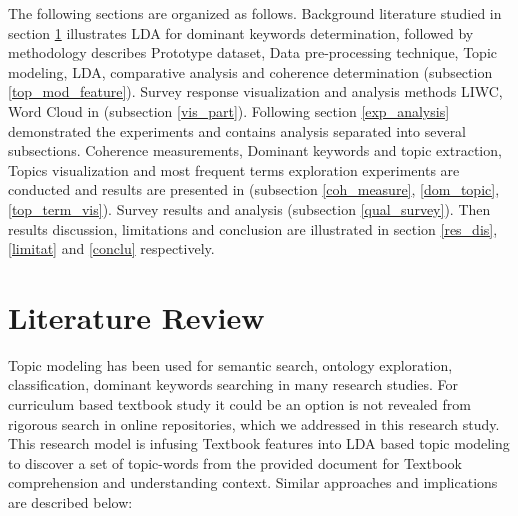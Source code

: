 \documentclass[sn-mathphys,Numbered]{sn-jnl}%
\theoremstyle{thmstyleone}%
\theoremstyle{thmstyletwo}%
\theoremstyle{thmstylethree}%
\begin{document}
The following sections are organized as follows. Background literature studied in section \ref{lit_review} illustrates LDA for dominant keywords determination, followed by methodology describes Prototype dataset, Data pre-processing technique, Topic modeling, LDA, comparative analysis and coherence determination (subsection \ref{top_mod_feature}). Survey response visualization and analysis methods LIWC, Word Cloud in (subsection \ref{vis_part}). Following section \ref{exp_analysis} demonstrated the experiments and contains analysis separated into several subsections. 
Coherence measurements, Dominant keywords and topic extraction, Topics visualization and most frequent terms exploration experiments are conducted and results are presented in (subsection \ref{coh_measure}, \ref{dom_topic}, \ref{top_term_vis}). Survey results and analysis (subsection \ref{qual_survey}). Then results discussion, limitations and conclusion are illustrated in section \ref{res_dis}, \ref{limitat} and \ref{conclu} respectively. 

  
\section{Literature Review}\label{lit_review}

Topic modeling has been used for semantic search, ontology exploration, classification, dominant keywords searching in many research studies. For curriculum based textbook study it could be an option is not revealed from rigorous search in online repositories, which we addressed in this research study. This research model is infusing Textbook features into LDA based topic modeling to discover a set of topic-words from the provided document for Textbook comprehension and understanding context. Similar approaches and implications are described below:
\end{document}
